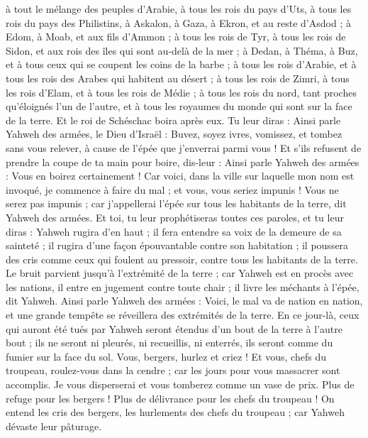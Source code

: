 \begin{multicols}{2}
à tout le mélange des peuples d'Arabie, à tous les rois du pays d’Uts, à tous les rois du pays des Philistins, à Askalon, à Gaza, à Ekron, et au reste d'Asdod ;
à Edom, à Moab, et aux fils d’Ammon ;
à tous les rois de Tyr, à tous les rois de Sidon, et aux rois des îles qui sont au-delà de la mer ;
à Dedan, à Théma, à Buz, et à tous ceux qui se coupent les coins de la barbe ;
à tous les rois d'Arabie, et à tous les rois des Arabes qui habitent au désert ;
à tous les rois de Zimri, à tous les rois d’Elam, et à tous les rois de Médie ;
à tous les rois du nord, tant proches qu'éloignés l'un de l'autre, et à tous les royaumes du monde qui sont sur la face de la terre. Et le roi de Schéschac boira après eux.
Tu leur diras : Ainsi parle Yahweh des armées, le Dieu d'Israël : Buvez, soyez ivres, vomissez, et tombez sans vous relever, à cause de l'épée que j'enverrai parmi vous !
Et s'ils refusent de prendre la coupe de ta main pour boire, dis-leur : Ainsi parle Yahweh des armées : Vous en boirez certainement !
Car voici, dans la ville sur laquelle mon nom est invoqué, je commence à faire du mal ; et vous, vous seriez impunis ! Vous ne serez pas impunis ; car j’appellerai l'épée sur tous les habitants de la terre, dit Yahweh des armées.
Et toi, tu leur prophétiseras toutes ces paroles, et tu leur diras : Yahweh rugira d'en haut ; il fera entendre sa voix de la demeure de sa sainteté ; il rugira d'une façon épouvantable contre son habitation ; il poussera des cris comme ceux qui foulent au pressoir, contre tous les habitants de la terre.
Le bruit parvient jusqu’à l’extrémité de la terre ; car Yahweh est en procès avec les nations, il entre en jugement contre toute chair ; il livre les méchants à l'épée, dit Yahweh.
Ainsi parle Yahweh des armées : Voici, le mal va de nation en nation, et une grande tempête se réveillera des extrémités de la terre.
En ce jour-là, ceux qui auront été tués par Yahweh seront étendus d’un bout de la terre à l’autre bout ; ils ne seront ni pleurés, ni recueillis, ni enterrés, ils seront comme du fumier sur la face du sol.
Vous, bergers, hurlez et criez ! Et vous, chefs du troupeau, roulez-vous dans la cendre ; car les jours pour vous massacrer sont accomplis. Je vous disperserai et vous tomberez comme un vase de prix.
Plus de refuge pour les bergers ! Plus de délivrance pour les chefs du troupeau !
On entend les cris des bergers, les hurlements des chefs du troupeau ; car Yahweh dévaste leur pâturage.

\end{multicols}
